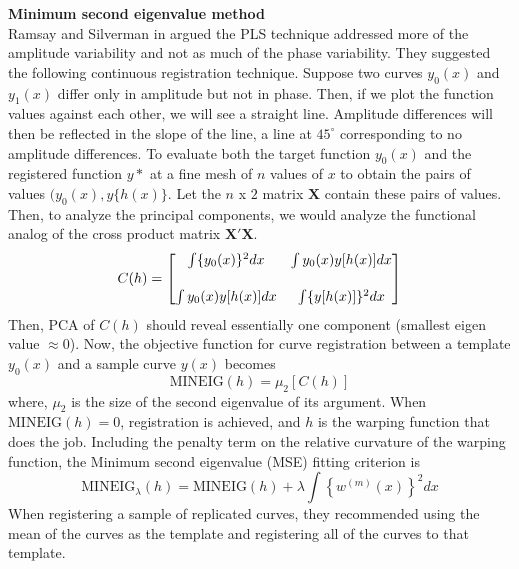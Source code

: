 \noindent
{\bf{Minimum second eigenvalue method}} \\
Ramsay and Silverman in \cite{Ramsay_2006_Functional} argued the PLS technique addressed more of the amplitude variability and not as much of the phase variability. They suggested the following continuous registration technique. Suppose two curves $y_0(x)$ and $y_1(x)$ differ only in amplitude but not in phase. Then, if we plot the function values against each other, we will see a straight line. Amplitude differences will then be reflected in the slope of the line, a line at $45^{\circ}$ corresponding to no amplitude differences. To evaluate both the target function $y_0(x)$ and the registered function $y*$ at a fine mesh of $n$ values of $x$ to obtain the pairs of values $(y_0(x), y\{h(x) \}$. Let the $n$ x $2$ matrix $\mathbf{X}$ contain these pairs of values. Then, to analyze the principal components, we would analyze the functional analog of the cross product matrix $\mathbf{X'X}$. 
\begin{equation}
C(h) = 
\begin{bmatrix}
\int \{y_0(x) \}^2dx & \int y_0(x) y[h(x)]dx \vspace{0.5cm} \\ 
\int y_0(x) y[h(x)]dx & \int \{y[h(x)]\}^2dx
\end{bmatrix}
\end{equation}
Then, PCA of $C(h)$ should reveal essentially one component (smallest eigen value $\approx 0$). Now, the objective function for curve registration between a template $y_0(x)$ and a sample curve $y(x)$ becomes
\[ \text{MINEIG}(h) = \mu_2[C(h)]\]
where, $\mu_2$ is the size of the second eigenvalue of its argument. When $\text{MINEIG}(h)=0$, registration is achieved, and $h$ is the warping function that does the job. Including the penalty term on the relative curvature of the warping function, the Minimum second eigenvalue (MSE) fitting criterion is
\begin{equation}
\text{MINEIG}_{\lambda}(h) = \text{MINEIG}(h) + \lambda \displaystyle \int \left\{ w^{(m)}(x) \right\}^2 dx
\end{equation}
When registering a sample of replicated curves, they \cite{Ramsay_etal_2009_Functional_R} recommended using the mean of the curves as the template and registering all of the curves to that template. \\

